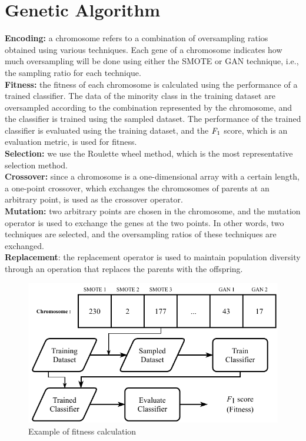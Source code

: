 \section{Genetic Algorithm}
\label{sec:ga}
\textbf{Encoding:} a chromosome refers to a combination of oversampling ratios obtained using various techniques.
Each gene of a chromosome indicates how much oversampling will be done using either the SMOTE or GAN technique, i.e., the sampling ratio for each technique.\\
\textbf{Fitness:} the fitness of each chromosome is calculated using the performance of a trained classifier.
The data of the minority class in the training dataset are oversampled according to the combination represented by the chromosome, and the classifier is trained using the sampled dataset.
The performance of the trained classifier is evaluated using the training dataset, and the $\emph{F}_{1}$ score, which is an evaluation metric, is used for fitness.\\
\textbf{Selection:} we use the Roulette wheel method, which is the most representative selection method.\\
\textbf{Crossover:} since a chromosome is a one-dimensional array with a certain length, a one-point crossover, which exchanges the chromosomes of parents at an arbitrary point, is used as the crossover operator.\\
\textbf{Mutation:} two arbitrary points are chosen in the chromosome, and the mutation operator is used to exchange the genes at the two points.
In other words, two techniques are selected, and the oversampling ratios of these techniques are exchanged.\\
\textbf{Replacement}: the replacement operator is used to maintain population diversity through an operation that replaces the parents with the offspring.

\begin{figure}[t]
    \centering
    \includegraphics[width=\columnwidth]{figure-1.pdf}
    \caption{Example of fitness calculation}
    \label{fig:1}
\end{figure}


